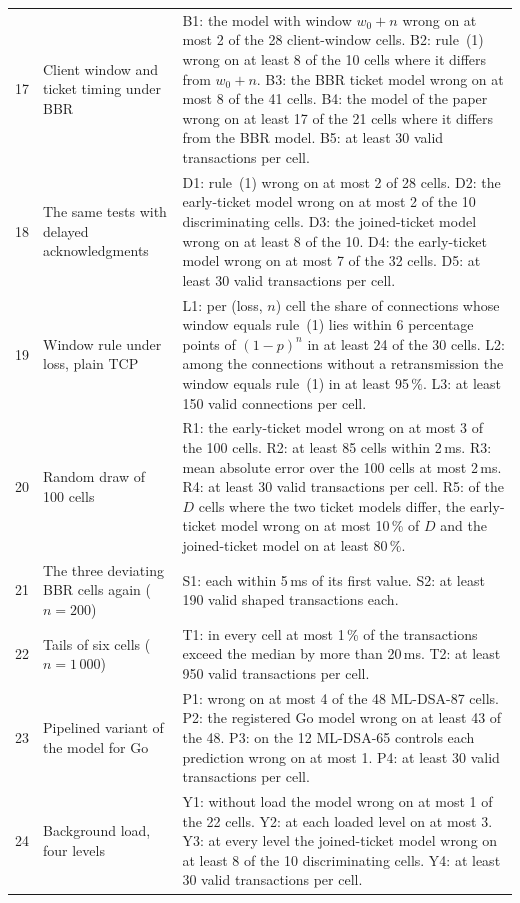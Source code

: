 \documentclass[9pt]{article}
\begin{document}
\begin{footnotesize}
\begin{longtable}{@{}p{}p{}p{}@{}}
17 & Client window and ticket timing under BBR & B1: the model with window $w_0+n$ wrong on at most 2 of the 28 client-window cells. B2: rule~(1) wrong on at least 8 of the 10 cells where it differs from $w_0+n$. B3: the BBR ticket model wrong on at most 8 of the 41 cells. B4: the model of the paper wrong on at least 17 of the 21 cells where it differs from the BBR model. B5: at least 30 valid transactions per cell.\\
18 & The same tests with delayed acknowledgments & D1: rule~(1) wrong on at most 2 of 28 cells. D2: the early-ticket model wrong on at most 2 of the 10 discriminating cells. D3: the joined-ticket model wrong on at least 8 of the 10. D4: the early-ticket model wrong on at most 7 of the 32 cells. D5: at least 30 valid transactions per cell.\\
19 & Window rule under loss, plain TCP & L1: per (loss, $n$) cell the share of connections whose window equals rule~(1) lies within 6 percentage points of $(1-p)^n$ in at least 24 of the 30 cells. L2: among the connections without a retransmission the window equals rule~(1) in at least 95\,\%. L3: at least 150 valid connections per cell.\\
20 & Random draw of 100 cells & R1: the early-ticket model wrong on at most 3 of the 100 cells. R2: at least 85 cells within 2\,ms. R3: mean absolute error over the 100 cells at most 2\,ms. R4: at least 30 valid transactions per cell. R5: of the $D$ cells where the two ticket models differ, the early-ticket model wrong on at most 10\,\% of $D$ and the joined-ticket model on at least 80\,\%.\\
21 & The three deviating BBR cells again ($n=200$) & S1: each within 5\,ms of its first value. S2: at least 190 valid shaped transactions each.\\
22 & Tails of six cells ($n=1\,000$) & T1: in every cell at most 1\,\% of the transactions exceed the median by more than 20\,ms. T2: at least 950 valid transactions per cell.\\
23 & Pipelined variant of the model for Go & P1: wrong on at most 4 of the 48 ML-DSA-87 cells. P2: the registered Go model wrong on at least 43 of the 48. P3: on the 12 ML-DSA-65 controls each prediction wrong on at most 1. P4: at least 30 valid transactions per cell.\\
24 & Background load, four levels & Y1: without load the model wrong on at most 1 of the 22 cells. Y2: at each loaded level on at most 3. Y3: at every level the joined-ticket model wrong on at least 8 of the 10 discriminating cells. Y4: at least 30 valid transactions per cell.\\

\end{longtable}
\end{footnotesize}
\end{document}
